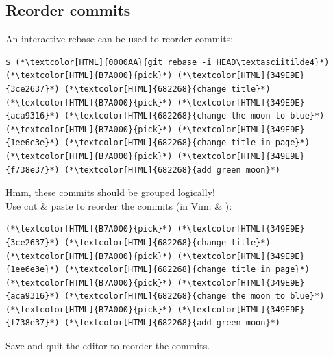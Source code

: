 \subsection{Reorder commits}
\begin{frame}[fragile]
  \subslidetitle
  An interactive rebase can be used to reorder commits:
  \begin{lstlisting}
$ (*\textcolor[HTML]{0000AA}{git rebase -i HEAD\textasciitilde4}*)
(*\textcolor[HTML]{B7A000}{pick}*) (*\textcolor[HTML]{349E9E}{3ce2637}*) (*\textcolor[HTML]{682268}{change title}*)
(*\textcolor[HTML]{B7A000}{pick}*) (*\textcolor[HTML]{349E9E}{aca9316}*) (*\textcolor[HTML]{682268}{change the moon to blue}*)
(*\textcolor[HTML]{B7A000}{pick}*) (*\textcolor[HTML]{349E9E}{1ee6e3e}*) (*\textcolor[HTML]{682268}{change title in page}*)
(*\textcolor[HTML]{B7A000}{pick}*) (*\textcolor[HTML]{349E9E}{f738e37}*) (*\textcolor[HTML]{682268}{add green moon}*)
\end{lstlisting}
  Hmm, these commits should be grouped logically!\\

  \vspace{1em}
  Use cut \& paste to reorder the commits (in Vim:  \& ):
  \begin{lstlisting}
(*\textcolor[HTML]{B7A000}{pick}*) (*\textcolor[HTML]{349E9E}{3ce2637}*) (*\textcolor[HTML]{682268}{change title}*)
(*\textcolor[HTML]{B7A000}{pick}*) (*\textcolor[HTML]{349E9E}{1ee6e3e}*) (*\textcolor[HTML]{682268}{change title in page}*)
(*\textcolor[HTML]{B7A000}{pick}*) (*\textcolor[HTML]{349E9E}{aca9316}*) (*\textcolor[HTML]{682268}{change the moon to blue}*)
(*\textcolor[HTML]{B7A000}{pick}*) (*\textcolor[HTML]{349E9E}{f738e37}*) (*\textcolor[HTML]{682268}{add green moon}*)
\end{lstlisting}
  Save and quit the editor to reorder the commits.
\end{frame}


